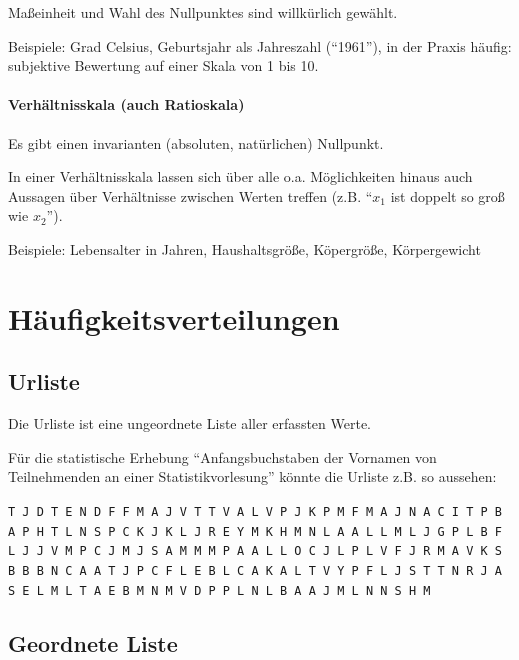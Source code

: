 \documentclass[
  11pt,
  ngerman,
  a4paper,
]{report}
\begin{document}
Maßeinheit und Wahl des Nullpunktes sind willkürlich gewählt.

Beispiele: Grad Celsius, Geburtsjahr als Jahreszahl (\enquote{1961}), in der Praxis häufig: subjektive Bewertung auf einer Skala von 1 bis 10.

\hypertarget{verhuxe4ltnisskala-auch-ratioskala}{%
\paragraph{Verhältnisskala (auch Ratioskala)}\label{verhuxe4ltnisskala-auch-ratioskala}}

Es gibt einen invarianten (absoluten, natürlichen) Nullpunkt.

In einer Verhältnisskala lassen sich über alle o.a. Möglichkeiten hinaus auch Aussagen über Verhältnisse zwischen Werten treffen (z.B. \enquote{\(x_1\) ist doppelt so groß wie \(x_2\)}).

Beispiele: Lebensalter in Jahren, Haushaltsgröße, Köpergröße,
Körpergewicht

\hypertarget{huxe4ufigkeitsverteilungen}{%
\section{Häufigkeitsverteilungen}\label{huxe4ufigkeitsverteilungen}}

\nopagebreak

\hypertarget{urliste}{%
\subsection{Urliste}\label{urliste}}

Die Urliste ist eine ungeordnete Liste aller erfassten Werte.

Für die statistische Erhebung \enquote{Anfangsbuchstaben der Vornamen von Teilnehmenden an einer Statistikvorlesung} könnte die Urliste z.B. so aussehen:

\texttt{T\ J\ D\ T\ E\ N\ D\ F\ F\ M\ A\ J\ V\ T\ T\ V\ A\ L\ V\ P\ J\ K\ P\ M\ F\ M\ A\ J\ N\ A\ C\ I\ T\ P\ B\ A\ P\ H\ T\ L\ N\ S\ P\ C\ K\ J\ K\ L\ J\ R\ E\ Y\ M\ K\ H\ M\ N\ L\ A\ A\ L\ L\ M\ L\ J\ G\ P\ L\ B\ F\ L\ J\ J\ V\ M\ P\ C\ J\ M\ J\ S\ A\ M\ M\ M\ P\ A\ A\ L\ L\ O\ C\ J\ L\ P\ L\ V\ F\ J\ R\ M\ A\ V\ K\ S\ B\ B\ B\ N\ C\ A\ A\ T\ J\ P\ C\ F\ L\ E\ B\ L\ C\ A\ K\ A\ L\ T\ V\ Y\ P\ F\ L\ J\ S\ T\ T\ N\ R\ J\ A\ S\ E\ L\ M\ L\ T\ A\ E\ B\ M\ N\ M\ V\ D\ P\ P\ L\ N\ L\ B\ A\ A\ J\ M\ L\ N\ N\ S\ H\ M}

\hypertarget{geordnete-liste}{%
\subsection{Geordnete Liste}\label{geordnete-liste}}
\end{document}
